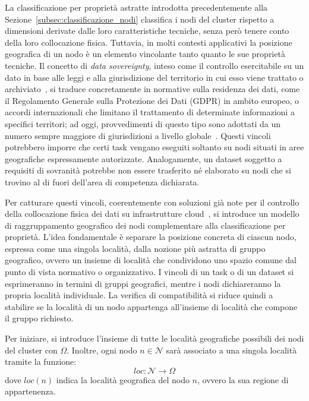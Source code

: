 La classificazione per proprietà astratte introdotta precedentemente alla Sezione~\ref{subsec:classificazione_nodi} classifica i nodi del cluster rispetto a dimensioni derivate dalle loro caratteristiche tecniche, senza però tenere conto della loro collocazione fisica. Tuttavia, in molti contesti applicativi la posizione geografica di un nodo è un elemento vincolante tanto quanto le sue proprietà tecniche. Il concetto di \emph{data sovereignty}, inteso come il controllo esercitabile su un dato in base alle leggi e alla giurisdizione del territorio in cui esso viene trattato o archiviato~\cite{data-sovereignty-review}, si traduce concretamente in normative sulla residenza dei dati, come il Regolamento Generale sulla Protezione dei Dati (GDPR) in ambito europeo, o accordi internazionali che limitano il trattamento di determinate informazioni a specifici territori; ad oggi, provvedimenti di questo tipo sono adottati da un numero sempre maggiore di giurisdizioni a livello globale~\cite{oecd-data-localisation}. Questi vincoli potrebbero imporre che certi task vengano eseguiti soltanto su nodi situati in aree geografiche espressamente autorizzate. Analogamente, un dataset soggetto a requisiti di sovranità potrebbe non essere trasferito né elaborato su nodi che si trovino al di fuori dell'area di competenza dichiarata.

Per catturare questi vincoli, coerentemente con soluzioni già note per il controllo della collocazione fisica dei dati su infrastrutture cloud~\cite{geolocation-aware-data-placement}, si introduce un modello di raggruppamento geografico dei nodi complementare alla classificazione per proprietà. L'idea fondamentale è separare la posizione concreta di ciascun nodo, espressa come una singola località, dalla nozione più astratta di gruppo geografico, ovvero un insieme di località che condividono uno spazio comune dal punto di vista normativo o organizzativo. I vincoli di un task o di un dataset si esprimeranno in termini di gruppi geografici, mentre i nodi dichiareranno la propria località individuale. La verifica di compatibilità si riduce quindi a stabilire se la località di un nodo appartenga all'insieme di località che compone il gruppo richiesto.

Per iniziare, si introduce l'insieme di tutte le località geografiche possibili dei nodi del cluster con $\Omega$. Inoltre, ogni nodo $n \in \mathcal{N}$ sarà associato a una singola località tramite la funzione:
\begin{equation}
    loc: \mathcal{N} \rightarrow \Omega
\end{equation}
dove $loc(n)$ indica la località geografica del nodo $n$, ovvero la sua regione di appartenenza.
 
